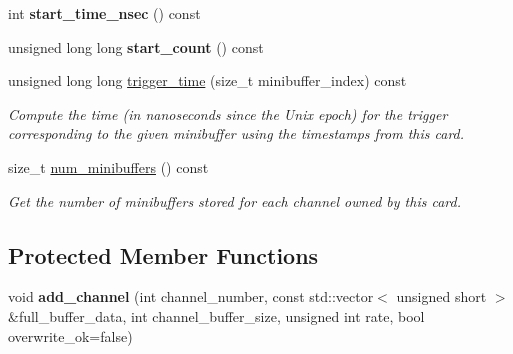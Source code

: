 \begin{DoxyCompactItemize}
\item 
\hypertarget{classannie_1_1RawCard_aeea00e9f783264147b2727086579dac2}{int {\bfseries start\-\_\-time\-\_\-nsec} () const }\label{classannie_1_1RawCard_aeea00e9f783264147b2727086579dac2}

\item 
\hypertarget{classannie_1_1RawCard_ae1be1b743170e50a80448d4516f0c201}{unsigned long long {\bfseries start\-\_\-count} () const }\label{classannie_1_1RawCard_ae1be1b743170e50a80448d4516f0c201}

\item 
\hypertarget{classannie_1_1RawCard_a525abf75a5bcff78842437b91d4cd3b1}{unsigned long long \hyperlink{classannie_1_1RawCard_a525abf75a5bcff78842437b91d4cd3b1}{trigger\-\_\-time} (size\-\_\-t minibuffer\-\_\-index) const }\label{classannie_1_1RawCard_a525abf75a5bcff78842437b91d4cd3b1}

\begin{DoxyCompactList}\small\item\em Compute the time (in nanoseconds since the Unix epoch) for the trigger corresponding to the given minibuffer using the timestamps from this card. \end{DoxyCompactList}\item 
\hypertarget{classannie_1_1RawCard_a9deb5ad2584690c58f41d4e9a5ce030c}{size\-\_\-t \hyperlink{classannie_1_1RawCard_a9deb5ad2584690c58f41d4e9a5ce030c}{num\-\_\-minibuffers} () const }\label{classannie_1_1RawCard_a9deb5ad2584690c58f41d4e9a5ce030c}

\begin{DoxyCompactList}\small\item\em Get the number of minibuffers stored for each channel owned by this card. \end{DoxyCompactList}\end{DoxyCompactItemize}
\subsection*{Protected Member Functions}
\begin{DoxyCompactItemize}
\item 
\hypertarget{classannie_1_1RawCard_a9a63a10eabb68630f99a1c45dcfbcfe5}{void {\bfseries add\-\_\-channel} (int channel\-\_\-number, const std\-::vector$<$ unsigned short $>$ \&full\-\_\-buffer\-\_\-data, int channel\-\_\-buffer\-\_\-size, unsigned int rate, bool overwrite\-\_\-ok=false)}\label{classannie_1_1RawCard_a9a63a10eabb68630f99a1c45dcfbcfe5}

\end{DoxyCompactItemize}
